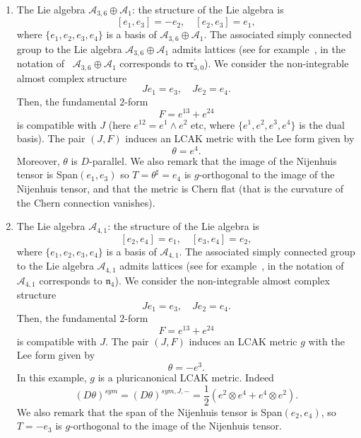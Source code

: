\documentclass[a4paper,11pt]{amsart}
\theoremstyle{definition}
\renewcommand{\[}{\begin{equation*}}
\renewcommand{\]}{\end{equation*}}
\begin{document}
\begin{enumerate}
\item{The Lie algebra $\mathcal{A}_{3,6}\oplus \mathcal{A}_1$}: the structure of the Lie algebra is 
$$[e_1,e_3]=-e_2,\quad [e_2,e_3]=e_1,$$
where $\{e_1,e_2,e_3,e_4\}$ is a basis of $\mathcal{A}_{3,6}\oplus \mathcal{A}_1$.
The associated simply connected group to the Lie algebra $\mathcal{A}_{3,6}\oplus \mathcal{A}_1$ admits lattices 
(see for example~\cite{MR3480018,MR3763412,MR4088745}, in the notation of~\cite{MR4088745} $\mathcal{A}_{3,6}\oplus \mathcal{A}_1$ corresponds to $\mathfrak{r}\mathfrak{r}^\prime_{3,0}$).
We consider the non-integrable almost complex structure
$$Je_1=e_3,\quad Je_2=e_4.$$
Then, the fundamental $2$-form
$$F=e^{13}+e^{24}$$
is compatible with $J$ (here $e^{12}=e^1\wedge e^2$ etc, where $\{e^1,e^2,e^3,e^4\}$ is the dual basis). The pair $(J,F)$ induces an LCAK metric with the Lee form given by
$$\theta=e^4.$$
Moreover, $\theta$ is $D$-parallel. We also remark that the image of the Nijenhuis tensor is Span$(e_1,e_3)$ so $T=\theta^\sharp=e_4$ is $g$-orthogonal to the image of the Nijenhuis tensor, and that the metric is Chern flat (that is the curvature of the Chern connection vanishes).\\

\item{The Lie algebra $\mathcal{A}_{4,1}$}: the structure of the Lie algebra is 
$$[e_2,e_4]=e_1,\quad [e_3,e_4]=e_2,$$
where $\{e_1,e_2,e_3,e_4\}$ is a basis of $\mathcal{A}_{4,1}$.
The associated simply connected group to the Lie algebra $\mathcal{A}_{4,1}$ admits lattices 
(see for example~\cite{MR3480018,MR3763412,MR4088745}, in the notation of~\cite{MR4088745} $\mathcal{A}_{4,1}$ corresponds to $\mathfrak{n}_{4}$). We consider the non-integrable almost complex structure
$$Je_1=e_3,\quad Je_2=e_4.$$
Then, the fundamental $2$-form
$$F=e^{13}+e^{24}$$
is compatible with $J$.  The pair $(J,F)$ induces an LCAK metric $g$ with the Lee form given by
$$\theta=-e^3.$$
In this example, $g$ is a pluricanonical LCAK metric. Indeed $$(D\theta)^{sym}=(D\theta)^{sym,J,-}=\frac{1}{2}\left(e^2\otimes e^4 +e^4\otimes e^2\right).$$
We also remark that the span of the Nijenhuis tensor is Span$(e_2,e_4)$, so $T=-e_3$ is $g$-orthogonal to the image of the Nijenhuis tensor.\\



\end{enumerate}
\end{document}
